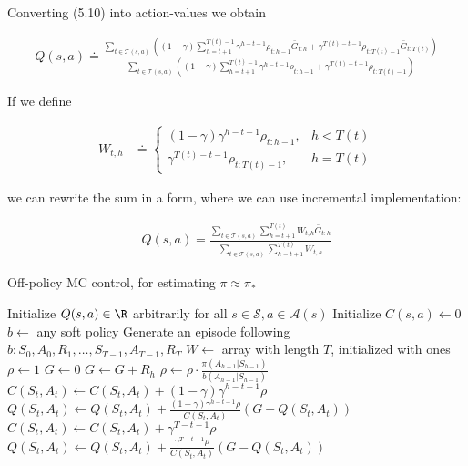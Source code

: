 \begin{solution}

Converting (5.10) into action-values we obtain

\begin{align*}
  Q(s,a) \doteq \frac{\sum_{t \in \mathcal{T}(s,a)}\left(
  (1 - \gamma)\sum_{h=t+1}^{T(t) - 1} \gamma^{h - t - 1}\rho_{t:h-1}\bar{G}_{t:h} + 
  \gamma^{T(t) - t - 1} \rho_{t:T(t)-1}\bar{G}_{t:T(t)}\right)}
  {\sum_{t \in \mathcal{T}(s,a)}\left(
  (1 - \gamma)\sum_{h=t+1}^{T(t) - 1} \gamma^{h - t - 1}\rho_{t:h-1} + 
  \gamma^{T(t) - t - 1} \rho_{t:T(t)-1}\right)}
\end{align*}

If we define

\begin{align*}
  W_{t,h} &\doteq \begin{cases}
    (1 - \gamma)\gamma^{h - t - 1}\rho_{t:h-1}, & h < T(t) \\
    \gamma^{T(t) - t - 1}\rho_{t:T(t) - 1}, & h = T(t)
  \end{cases}
\end{align*}

we can rewrite the sum in a form, where we can use incremental implementation:

\begin{align*}
  Q(s,a) = \frac{\sum_{t \in \mathcal{T}(s,a)}\sum_{h=t+1}^{T(t)}W_{t,h}\bar{G}_{t:h}}
  {\sum_{t \in \mathcal{T}(s,a)}\sum_{h=t+1}^{T(t)}W_{t,h}}
\end{align*}
\begin{algorithm}
    \caption{Off-policy MC control, for estimating $\pi \approx \pi_*$}
    \begin{algorithmic}[1]
      \State Initialize $Q(s,a) \in \R$ arbitrarily for all $s \in \mathcal{S}, a \in \mathcal{A}(s)$
      \State Initialize $C(s,a) \leftarrow 0$
        \State $b \leftarrow$ any soft policy
        \State Generate an episode following $b: S_0,A_0,R_1,\dots,S_{T-1},A_{T-1},R_T$
        \State $W \leftarrow $ array with length $T$, initialized with ones
          \State $\rho \leftarrow 1$
          \State $G \leftarrow 0$
              \State $G \leftarrow G + R_h$
              \State $\rho \leftarrow \rho \cdot \frac{\pi(A_{h-1}|S_{h-1})}{b(A_{h-1}|S_{h-1})}$
                \State $C(S_t,A_t) \leftarrow C(S_t,A_t) + (1-\gamma)\gamma^{h - t - 1}\rho$
                \State $Q(S_t,A_t) \leftarrow Q(S_t,A_t) + 
                \frac{(1-\gamma)\gamma^{h - t - 1}\rho}{C(S_t,A_t)}(G - Q(S_t,A_t))$
              \Else
                \State $C(S_t,A_t) \leftarrow C(S_t,A_t) + \gamma^{T - t - 1}\rho$
                \State $Q(S_t,A_t) \leftarrow Q(S_t,A_t) + 
                \frac{\gamma^{T - t - 1}\rho}{C(S_t,A_t)}(G - Q(S_t,A_t))$
              \EndIf
            \EndFor
            \EndIf
        \EndFor
      \EndWhile
    \end{algorithmic}
\end{algorithm}

\FloatBarrier

\end{solution}

